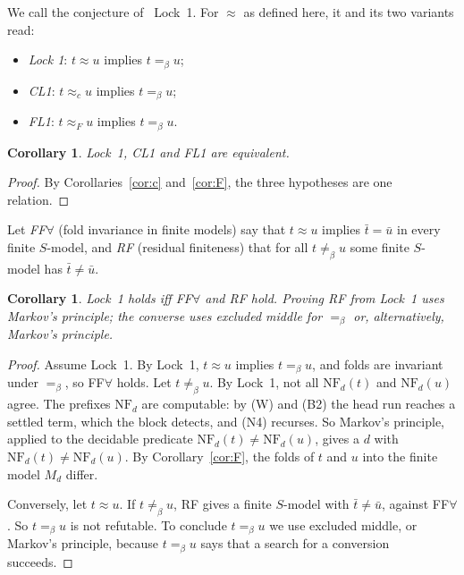 \documentclass[11pt]{amsart}
\newtheorem{corollary}[theorem]{Corollary}
\theoremstyle{definition}
\newcommand{\conv}{=_\beta}
\newcommand{\NF}{\mathrm{NF}}
\newcommand{\eqc}{\approx_c}
\newcommand{\eqF}{\approx_F}
\begin{document}
We call the conjecture of~\citep[Conjecture~11]{s6} Lock~1. For
$\approx$ as defined here, it and its two variants read:
\begin{itemize}
\item \emph{Lock 1}: $t\approx u$ implies $t\conv u$;
\item \emph{CL1}: $t\eqc u$ implies $t\conv u$;
\item \emph{FL1}: $t\eqF u$ implies $t\conv u$.
\end{itemize}

\begin{corollary}\label{cor:lock}
Lock~1, CL1 and FL1 are equivalent.
\end{corollary}

\begin{proof}
By Corollaries~\ref{cor:c} and~\ref{cor:F}, the three hypotheses are one relation.
\end{proof}

Let \emph{FF$\forall$} (fold invariance in finite models) say that $t\approx u$ implies $\bar t=\bar u$ in every finite $S$-model, and
\emph{RF} (residual finiteness) that for all $t\not\conv u$ some finite $S$-model has $\bar t\ne\bar u$.

\begin{corollary}\label{cor:rf}
Lock~1 holds iff FF$\forall$ and RF hold. Proving RF from Lock~1 uses Markov's principle; the
converse uses excluded middle for $\conv$ or, alternatively, Markov's principle.
\end{corollary}

\begin{proof}
Assume Lock~1. By Lock~1, $t\approx u$ implies $t\conv u$, and folds are invariant under $\conv$, so
FF$\forall$ holds. Let $t\not\conv u$. By Lock~1, not all $\NF_d(t)$ and $\NF_d(u)$ agree. The
prefixes $\NF_d$ are computable: by (W) and (B2) the head run reaches a settled term, which the block
detects, and (N4) recurses. So Markov's principle, applied to the decidable predicate
$\NF_d(t)\ne\NF_d(u)$, gives a $d$ with $\NF_d(t)\ne\NF_d(u)$. By Corollary~\ref{cor:F}, the folds of
$t$ and $u$ into the finite model $M_d$ differ.

Conversely, let $t\approx u$. If $t\not\conv u$, RF gives a finite $S$-model with $\bar t\ne\bar u$,
against FF$\forall$. So $t\conv u$ is not refutable. To conclude $t\conv u$ we use excluded middle,
or Markov's principle, because $t\conv u$ says that a search for a conversion succeeds.
\end{proof}
\end{document}
